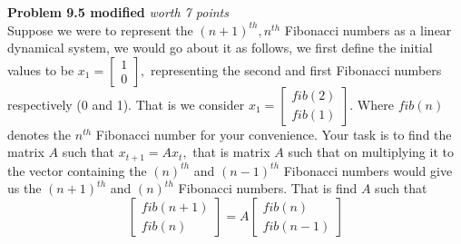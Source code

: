 \documentclass{article}
\newenvironment{problem}[3][Problem]
    { \begin{mdframed}[backgroundcolor=gray!20] \textbf{#1 #2} \textit{worth #3 points} \\}
    {  \end{mdframed}}
\begin{document}
\begin{problem}{9.5 modified}{7}
    Suppose we were to represent the $(n+1)^{th}, n^{th}$ Fibonacci numbers as a linear dynamical system, we would go about it as follows, we first define the initial values to be $x_1 = \begin{bmatrix} 1 \\ 0 \end{bmatrix},$ representing the second and first Fibonacci numbers respectively (0 and 1). That is we consider $x_1 = \begin{bmatrix} fib(2) \\ fib(1) \end{bmatrix}.$ Where $fib(n)$ denotes the $n^{th}$ Fibonacci number for your convenience. Your task is to find the matrix $A$ such that $x_{t+1}= Ax_t,$ that is matrix $A$ such that on multiplying it to the vector containing the $(n)^{th}$ and $(n-1)^{th}$ Fibonacci numbers would give us the $(n+1)^{th}$ and $(n)^{th}$ Fibonacci numbers. That is find $A$ such that $$\begin{bmatrix} fib(n+1) \\ fib(n) \end{bmatrix} = A \begin{bmatrix} fib(n) \\ fib(n-1) \end{bmatrix}$$ 
\end{problem}
\end{document}
